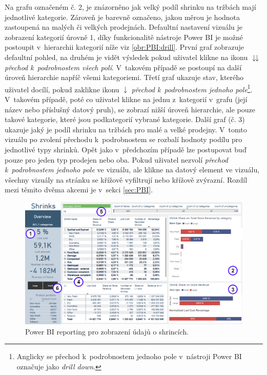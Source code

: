 Na grafu označeném č. 2, je znázorněno jak velký podíl shrinku na tržbách mají jednotlivé kategorie. Zároveň je barevně označeno, jakou měrou je hodnota zastoupená na malých či velkých prodejnách. Defaultní nastavení vizuálu je zobrazení kategorií úrovně 1, díky funkcionalitě nástroje Power BI je možné postoupit v~hierarchii kategorií níže viz \ref*{obr:PBI:drill}. První graf zobrazuje defaultní pohled, na druhém je vidět výsledek pokud uživatel klikne na ikonu $\downdownarrows$ \emph{přechod k~podrobnostem všech polí}. V~takovém případě se postoupí na další úroveň hierarchie napříč všemi kategoriemi. Třetí graf ukazuje stav, kterého uživatel docílí, pokud zaklikne ikonu $\downarrow$ \emph{přechod k~podrobnostem jednoho pole}\footnote{Anglicky se přechod k~podrobnostem jednoho pole v~nástroji Power BI označuje jako \emph{drill down}.}. V~takovém případě, poté co uživatel klikne na jednu z~kategorií v~grafu (její název nebo příslušný datový pruh), se zobrazí nižší úroveň hierarchie, ale pouze takové kategorie, které jsou podkategorií vybrané kategorie. 
Další graf (č. 3) ukazuje jaký je podíl shrinku na tržbách pro malé a velké prodejny. V~tomto vizuálu po zvolení přechodu k~podrobnostem se rozbalí hodnoty podílu pro jednotlivé typy shrinků. Opět jako v~předchozím případě lze postupovat buď pouze pro jeden typ prodejen nebo oba.
Pokud uživatel nezvolí \emph{přechod k~podrobnostem jednoho pole} ve vizuálu, ale klikne na datový element ve vizuálu, všechny vizuály na stránku se křížově vyfiltrují nebo křížově zvýrazní. Rozdíl mezi těmito dvěma akcemi je v~sekci \ref*{sec:PBI}. 
\begin{figure}[h!]
    \centering
    \captionsetup{justification=centering}
    \includegraphics[width=\textwidth]{obrazky/PBI/overview.png}
    \caption{Power BI reporting pro zobrazení údajů o shrincích.}
    \label{obr:PBI:overview}
\end{figure}

